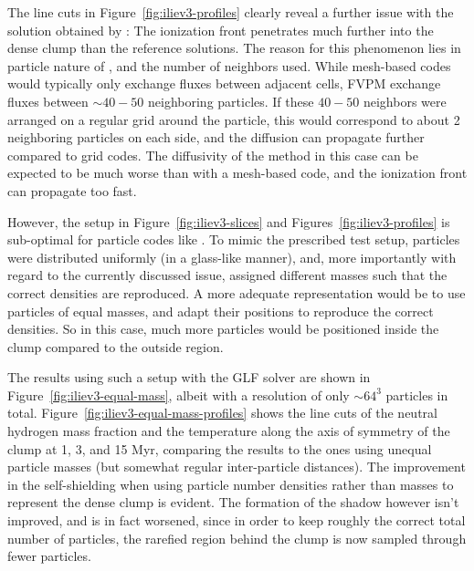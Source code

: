 The line cuts in Figure~\ref{fig:iliev3-profiles} clearly reveal a further issue with the solution
obtained by \GEARRT: The ionization front penetrates much further into the dense clump than the
reference solutions. The reason for this phenomenon lies in particle nature of \GEARRT, and the
number of neighbors used.
While mesh-based codes would typically only exchange fluxes between adjacent cells, FVPM exchange
fluxes between $\sim 40-50$ neighboring particles. If these $40-50$ neighbors were arranged on a
regular grid around the particle, this would correspond to about 2 neighboring particles on each
side, and the diffusion can propagate further compared to grid codes. The diffusivity of the method
in this case can be expected to be much worse than with a mesh-based code, and the ionization front
can propagate too fast.

However, the setup in Figure~\ref{fig:iliev3-slices} and Figures~\ref{fig:iliev3-profiles} is
sub-optimal for particle codes like \GEARRT. To mimic the prescribed test setup, particles were
distributed uniformly (in a glass-like manner), and, more importantly with regard to the currently
discussed issue, assigned different masses such that the correct densities are reproduced. A more
adequate representation would be to use particles of equal masses, and adapt their positions to
reproduce the correct densities. So in this case, much more particles would be positioned inside the
clump compared to the outside region.

The results using such a setup with the GLF solver are shown in Figure~\ref{fig:iliev3-equal-mass},
albeit with a resolution of only $\sim 64^3$ particles in total.
Figure~\ref{fig:iliev3-equal-mass-profiles} shows the line cuts of the neutral hydrogen mass
fraction and the temperature along the axis of symmetry of the clump at 1, 3, and 15 Myr, comparing
the results to the ones using unequal particle masses (but somewhat regular inter-particle
distances). The improvement in the self-shielding when using particle number densities rather than
masses to represent the dense clump is evident. The formation of the shadow however isn't improved,
and is in fact worsened, since in order to keep roughly the correct total number of particles, the
rarefied region behind the clump is now sampled through fewer particles.

